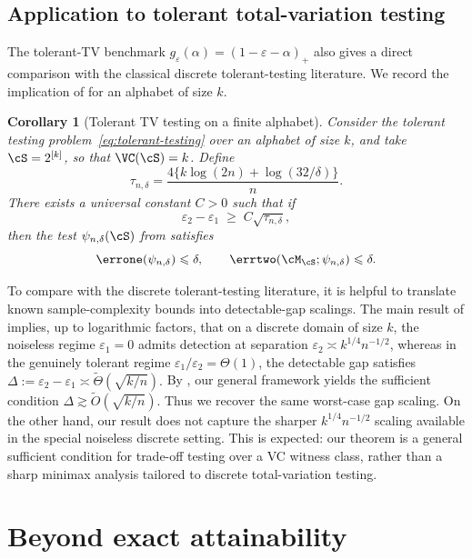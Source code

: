 \documentclass[english]{article}
\theoremstyle{plain}
\newtheorem{corollary}{Corollary}[section]
\theoremstyle{definition}
\begin{document}
\subsection{Application to tolerant total-variation testing}

The tolerant-TV benchmark \(g_\varepsilon(\alpha)=(1-\varepsilon-\alpha)_+\)
also gives a direct comparison with the classical discrete tolerant-testing
literature. We record the implication of  for
an alphabet of size \(k\).


\begin{corollary}[Tolerant TV testing on a finite alphabet]
\label{cor:tvtolerant-vc}
Consider the tolerant testing problem~\eqref{eq:tolerant-testing} over an
alphabet of size \(k\), and take \(\cS=2^{[k]}\), so that
\(\VC(\cS)=k\). Define
\[
\tau_{n,\delta}
=
\frac{4\{k\log(2n)+\log(32/\delta)\}}{n}.
\]
There exists a universal constant \(C>0\) such that if
\[
\varepsilon_2-\varepsilon_1
\;\geqslant\;
C\sqrt{\tau_{n,\delta}},
\]
then the test \(\psi_{n,\delta}(\cS)\) from 
satisfies
\[
\errone(\psi_{n,\delta})\leqslant \delta,
\qquad
\errtwo(\cM_{\cS};\psi_{n,\delta})\leqslant \delta.
\]
\end{corollary}

To compare  with the discrete
tolerant-testing literature, it is helpful to translate known
sample-complexity bounds into detectable-gap scalings. The main result of
\cite{price2021tolerant} implies, up to logarithmic factors, that on a
discrete domain of size \(k\), the noiseless regime \(\varepsilon_1=0\)
admits detection at separation \(\varepsilon_2 \asymp k^{1/4}n^{-1/2}\),
whereas in the genuinely tolerant regime
\(\varepsilon_1/\varepsilon_2=\Theta(1)\), the detectable gap satisfies
$
\Delta:=\varepsilon_2-\varepsilon_1
\asymp
\widetilde\Theta\!\left(\sqrt{k/n}\right).
$
By , our general framework yields the
sufficient condition
$
\Delta \gtrsim \widetilde O\!(\sqrt{k/n}).
$
Thus we recover the same worst-case gap scaling. On the other hand, our
result does not capture the sharper \(k^{1/4}n^{-1/2}\) scaling available in
the special noiseless discrete setting. This is expected: our theorem is a
general sufficient condition for trade-off testing over a VC witness class,
rather than a sharp minimax analysis tailored to discrete total-variation
testing.

\section{Beyond exact attainability}
\label{sec:misspecification}
\end{document}
